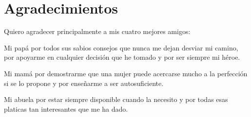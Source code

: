 


\setcounter{savepage}{\thepage}
\begin{abstractpage}

\end{abstractpage}

% 

\cleardoublepage

\section*{Agradecimientos}

Quiero agradecer principalmente a mis cuatro mejores amigos:

Mi papá por todos sus sabios consejos que nunca me dejan desviar mi camino, por apoyarme en cualquier decisión que he tomado y por ser siempre mi héroe.

Mi mamá por demostrarme que una mujer puede acercarse mucho a la perfección si se lo propone y por enseñarme a ser autosuficiente.

Mi abuela por estar siempre disponible cuando la necesito y por todas esas platicas tan interesantes que me ha dado.

